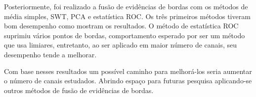 \documentclass[conference]{IEEEtran}
\begin{document}
Posteriormente, foi realizado a fusão de evidências de bordas com os métodos de média simples, SWT, PCA e estatística ROC. Os três primeiros métodos tiveram bom desempenho como mostram os resultados. O método de estatística ROC suprimiu vários pontos de bordas, comportamento esperado por ser um método que usa limiares, entretanto, ao ser aplicado em maior número de canais, seu desempenho tende a melhorar. 

Com base nesses resultados um possível caminho para melhorá-los seria aumentar o número de canais estudados. Abrindo espaço para futuras pesquisa aplicando-se outros métodos de fusão de evidências de bordas.



\end{document}
